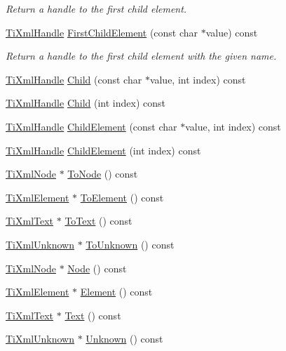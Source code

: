 \begin{DoxyCompactItemize}
\begin{DoxyCompactList}\small\item\em \-Return a handle to the first child element. \end{DoxyCompactList}\item 
\hypertarget{class_ti_xml_handle_af0aea751320f5e430fac6f8fff3b8dd4}{\hyperlink{class_ti_xml_handle}{\-Ti\-Xml\-Handle} \hyperlink{class_ti_xml_handle_af0aea751320f5e430fac6f8fff3b8dd4}{\-First\-Child\-Element} (const char $\ast$value) const }\label{class_ti_xml_handle_af0aea751320f5e430fac6f8fff3b8dd4}

\begin{DoxyCompactList}\small\item\em \-Return a handle to the first child element with the given name. \end{DoxyCompactList}\item 
\hyperlink{class_ti_xml_handle}{\-Ti\-Xml\-Handle} \hyperlink{class_ti_xml_handle_a072492b4be1acdb0db2d03cd8f71ccc4}{\-Child} (const char $\ast$value, int index) const 
\item 
\hyperlink{class_ti_xml_handle}{\-Ti\-Xml\-Handle} \hyperlink{class_ti_xml_handle_af9cf6a7d08a5da94a8924425ad0cd5ac}{\-Child} (int index) const 
\item 
\hyperlink{class_ti_xml_handle}{\-Ti\-Xml\-Handle} \hyperlink{class_ti_xml_handle_a979a3f850984a176ee884e394c7eed2d}{\-Child\-Element} (const char $\ast$value, int index) const 
\item 
\hyperlink{class_ti_xml_handle}{\-Ti\-Xml\-Handle} \hyperlink{class_ti_xml_handle_a8786475b9d1f1518492e3a46704c7ef0}{\-Child\-Element} (int index) const 
\item 
\hyperlink{class_ti_xml_node}{\-Ti\-Xml\-Node} $\ast$ \hyperlink{class_ti_xml_handle_af678e5088e83be67baf76f699756f2c3}{\-To\-Node} () const 
\item 
\hyperlink{class_ti_xml_element}{\-Ti\-Xml\-Element} $\ast$ \hyperlink{class_ti_xml_handle_abc6e7ed383a5fe1e52b0c0004b457b9e}{\-To\-Element} () const 
\item 
\hyperlink{class_ti_xml_text}{\-Ti\-Xml\-Text} $\ast$ \hyperlink{class_ti_xml_handle_a4ac53a652296203a5b5e13854d923586}{\-To\-Text} () const 
\item 
\hyperlink{class_ti_xml_unknown}{\-Ti\-Xml\-Unknown} $\ast$ \hyperlink{class_ti_xml_handle_a1381c17507a130767b1e23afc93b3674}{\-To\-Unknown} () const 
\item 
\hyperlink{class_ti_xml_node}{\-Ti\-Xml\-Node} $\ast$ \hyperlink{class_ti_xml_handle_ab44b723a8dc9af72838a303c079d0376}{\-Node} () const 
\item 
\hyperlink{class_ti_xml_element}{\-Ti\-Xml\-Element} $\ast$ \hyperlink{class_ti_xml_handle_acb5fe8388a526289ea65e817a51e05e7}{\-Element} () const 
\item 
\hyperlink{class_ti_xml_text}{\-Ti\-Xml\-Text} $\ast$ \hyperlink{class_ti_xml_handle_a9fc739c8a18d160006f82572fc143d13}{\-Text} () const 
\item 
\hyperlink{class_ti_xml_unknown}{\-Ti\-Xml\-Unknown} $\ast$ \hyperlink{class_ti_xml_handle_a49675b74357ba2aae124657a9a1ef465}{\-Unknown} () const 
\end{DoxyCompactItemize}

